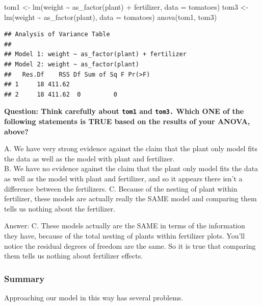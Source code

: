 \documentclass[
  openany]{book}
\newenvironment{Shaded}{\begin{snugshade}}{\end{snugshade}}
\newcommand{\AttributeTok}[1]{\textcolor[rgb]{0.77,0.63,0.00}{#1}}
\newcommand{\FunctionTok}[1]{\textcolor[rgb]{0.00,0.00,0.00}{#1}}
\newcommand{\NormalTok}[1]{#1}
\newcommand{\OtherTok}[1]{\textcolor[rgb]{0.56,0.35,0.01}{#1}}
\newcommand{\SpecialCharTok}[1]{\textcolor[rgb]{0.00,0.00,0.00}{#1}}
\begin{document}
\begin{Shaded}
\begin{Highlighting}[]
\NormalTok{tom1 }\OtherTok{\textless{}{-}} \FunctionTok{lm}\NormalTok{(weight }\SpecialCharTok{\textasciitilde{}} \FunctionTok{as\_factor}\NormalTok{(plant) }\SpecialCharTok{+}\NormalTok{ fertilizer, }\AttributeTok{data =}\NormalTok{ tomatoes)}
\NormalTok{tom3 }\OtherTok{\textless{}{-}} \FunctionTok{lm}\NormalTok{(weight }\SpecialCharTok{\textasciitilde{}} \FunctionTok{as\_factor}\NormalTok{(plant), }\AttributeTok{data =}\NormalTok{ tomatoes)}
\FunctionTok{anova}\NormalTok{(tom1, tom3)}
\end{Highlighting}
\end{Shaded}

\begin{verbatim}
## Analysis of Variance Table
## 
## Model 1: weight ~ as_factor(plant) + fertilizer
## Model 2: weight ~ as_factor(plant)
##   Res.Df    RSS Df Sum of Sq F Pr(>F)
## 1     18 411.62                      
## 2     18 411.62  0         0
\end{verbatim}

\textbf{Question: Think carefully about \texttt{tom1} and \texttt{tom3.} Which ONE of the following statements is TRUE based on the results of your ANOVA, above?}

A. We have very strong evidence against the claim that the plant only model fits the data as well as the model with plant and fertilizer.\\
B. We have no evidence against the claim that the plant only model fits the data as well as the model with plant and fertilizer, and so it appears there isn't a difference between the fertilizers.
C. Because of the nesting of plant within fertilizer, these models are actually really the SAME model and comparing them tells us nothing about the fertilizer.

Answer: C. These models actually are the SAME in terms of the information they have, because of the total nesting of plants within fertilizer plots. You'll notice the residual degrees of freedom are the same. So it is true that comparing them tells us nothing about fertilizer effects.

\hypertarget{summary}{%
\subsubsection{Summary}\label{summary}}

Approaching our model in this way has several problems.
\end{document}

